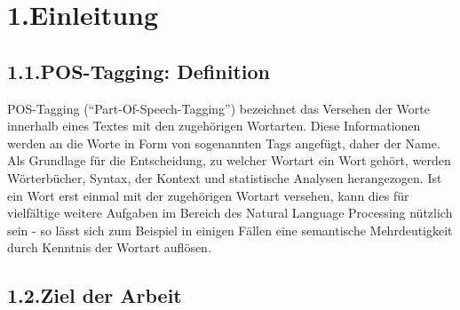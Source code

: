 \documentclass{article}
\begin{document}
\begin{mdtoc}
\begin{mdtocblock}
\begin{mdtocblock}
\begin{mdtocblock}
\end{mdtocblock}%
\end{mdtocblock}%


\end{mdtocblock}%
\end{mdtoc}%

\noindent{}\newpage{}%

\newpage{}%

\section{1.\hspace*{0.5em}Einleitung}\label{sec-einleitung}%

\subsection{1.1.\hspace*{0.5em}POS-Tagging: Definition}\label{sec-pos-tagging--definition}%

\noindent{}POS-Tagging (\textquotedblleft{}Part-Of-Speech-Tagging\textquotedblright{}) bezeichnet das Versehen der Worte innerhalb eines Textes mit den zugehörigen Wortarten. Diese Informationen werden an die Worte in Form von sogenannten Tags angefügt, daher der Name.
Als Grundlage für die Entscheidung, zu welcher Wortart ein Wort gehört, werden Wörterbücher, Syntax, der Kontext und statistische Analysen herangezogen.
Ist ein Wort erst einmal mit der zugehörigen Wortart versehen, kann dies für vielfältige weitere Aufgaben im Bereich des Natural Language Processing nützlich sein - so lässt sich zum Beispiel in einigen Fällen eine semantische Mehrdeutigkeit durch Kenntnis der Wortart auflösen.%

\subsection{1.2.\hspace*{0.5em}Ziel der Arbeit}\label{sec-ziel-der-arbeit}%
\end{document}
